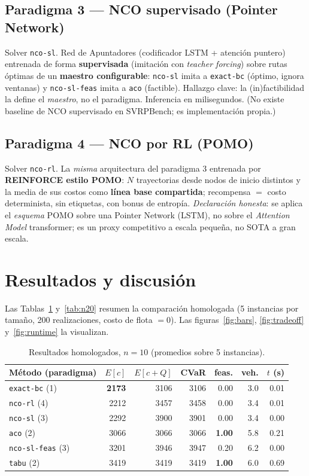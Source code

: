 \documentclass[11pt,a4paper]{article}
\newcommand{\code}[1]{\texttt{\small #1}}
\begin{document}
\subsection{Paradigma 3 --- NCO supervisado (Pointer Network)}
Solver \code{nco-sl}. Red de Apuntadores (codificador LSTM + atención puntero) entrenada de
forma \textbf{supervisada} (imitación con \emph{teacher forcing}) sobre rutas óptimas de un
\textbf{maestro configurable}: \code{nco-sl} imita a \code{exact-bc} (óptimo, ignora ventanas)
y \code{nco-sl-feas} imita a \code{aco} (factible). Hallazgo clave: la (in)factibilidad la
define el \emph{maestro}, no el paradigma. Inferencia en milisegundos. (No existe baseline de
NCO supervisado en SVRPBench; es implementación propia.)

\subsection{Paradigma 4 --- NCO por RL (POMO)}
Solver \code{nco-rl}. La \emph{misma} arquitectura del paradigma 3 entrenada por
\textbf{REINFORCE estilo POMO}: $N$ trayectorias desde nodos de inicio distintos y la media de
sus costos como \textbf{línea base compartida}; recompensa $=$ costo determinista, sin
etiquetas, con bonus de entropía. \emph{Declaración honesta}: se aplica el \emph{esquema} POMO
sobre una Pointer Network (LSTM), no sobre el \emph{Attention Model} transformer; es un proxy
competitivo a escala pequeña, no SOTA a gran escala.

\section{Resultados y discusión}
\label{sec:resultados}

Las Tablas~\ref{tab:n10} y~\ref{tab:n20} resumen la comparación homologada (5 instancias por
tamaño, 200 realizaciones, costo de flota $=0$). Las figuras~\ref{fig:bars},
\ref{fig:tradeoff} y~\ref{fig:runtime} la visualizan.

\begin{table}[h]
  \centering
  \caption{Resultados homologados, $n=10$ (promedios sobre 5 instancias).}
  \label{tab:n10}
  \begin{tabular}{lrrrrrr}
    \toprule
    Método (paradigma) & $E[c]$ & $E[c{+}Q]$ & CVaR & feas. & veh. & $t$ (s)\\
    \midrule
    \code{exact-bc} (1)    & \textbf{2173} & 3106 & 3106 & 0.00 & 3.0 & 0.01\\
    \code{nco-rl} (4)      & 2212 & 3457 & 3458 & 0.00 & 3.4 & 0.01\\
    \code{nco-sl} (3)      & 2292 & 3900 & 3901 & 0.00 & 3.4 & 0.00\\
    \code{aco} (2)         & 3066 & 3066 & 3066 & \textbf{1.00} & 5.8 & 0.21\\
    \code{nco-sl-feas} (3) & 3201 & 3946 & 3947 & 0.20 & 6.2 & 0.00\\
    \code{tabu} (2)        & 3419 & 3419 & 3419 & \textbf{1.00} & 6.0 & 0.69\\
    \bottomrule
  \end{tabular}
\end{table}
\end{document}
